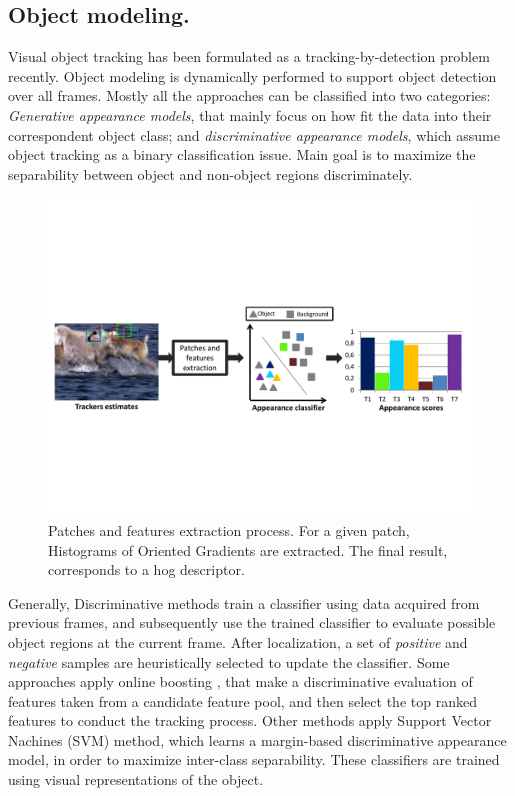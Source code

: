 \subsection{Object modeling.}
Visual object tracking has been formulated as a tracking-by-detection problem
recently. Object modeling is dynamically performed to support object detection
over all frames. Mostly all the approaches can be classified into two categories:
\textit{Generative appearance models}, that mainly focus on how fit the data into
their correspondent object class; and \textit{discriminative appearance models},
which assume object tracking as a binary classification issue. Main goal is to
maximize the separability between object and non-object regions discriminately.

\begin{figure}[t!]
\centering
\includegraphics[page=2, width=1\linewidth, trim= 0.4cm 8.5cm 4cm 5cm,
                 clip=true]{Figures/figures_mod}
\caption[Patches and features extraction process]
{\small Patches and features extraction process. For a given patch, Histograms
of Oriented Gradients are extracted. The final result, corresponds to a hog
descriptor.
}
\label{fig::features_extraction}
\end{figure}

Generally, Discriminative methods train a classifier using data acquired from
previous frames, and subsequently use the trained classifier to evaluate
possible object regions at the current frame. After localization, a set of
\textit{positive} and \textit{negative} samples are heuristically selected to
update the classifier. Some approaches apply online boosting
\cite{Babenko2010,Grabner2008,Grabner2006}, that make a discriminative
evaluation of features taken from a candidate feature pool, and then select the
top ranked features to conduct the tracking process. Other methods apply
Support Vector Nachines (SVM) method, which learns a margin-based discriminative
appearance model, in order to maximize inter-class separability. These
classifiers are trained using visual representations of the object.

